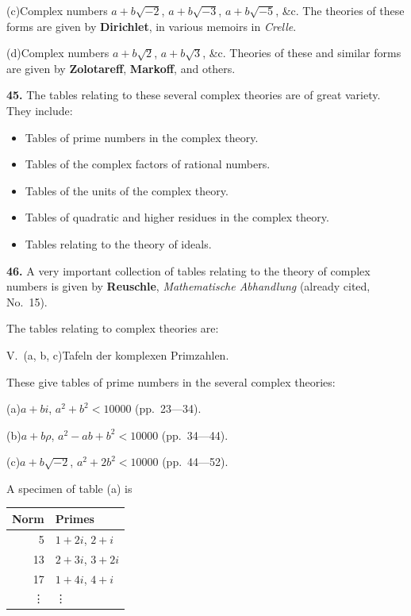 \documentclass[11pt,a4paper]{book}
\begin{document}
\quad(c)\quad Complex numbers $a + b\sqrt{-2}$, $a + b\sqrt{-3}$, $a + b\sqrt{-5}$, \&c.
The theories of these forms are given by
\quad\textbf{Dirichlet}, in various memoirs in \textit{Crelle}.

\quad(d)\quad Complex numbers $a + b\sqrt{2}$, $a + b\sqrt{3}$, \&c.
Theories of these and similar forms are given by
\quad\textbf{Zolotareff}, \textbf{Markoff}, and others.

\textbf{45.} The tables relating to these several complex theories are of great variety.
They include:
\begin{itemize}
\item Tables of prime numbers in the complex theory.
\item Tables of the complex factors of rational numbers.
\item Tables of the units of the complex theory.
\item Tables of quadratic and higher residues in the complex theory.
\item Tables relating to the theory of ideals.
\end{itemize}

\textbf{46.} A very important collection of tables relating to the theory of complex numbers
is given by
\quad\textbf{Reuschle}, \textit{Mathematische Abhandlung} (already cited, No.\ 15).

The tables relating to complex theories are:

\quad V.\ (a, b, c)\quad Tafeln der komplexen Primzahlen.

These give tables of prime numbers in the several complex theories:

\quad(a)\quad $a + bi$, $a^{2} + b^{2} < 10000$ (pp.\ 23---34).

\quad(b)\quad $a + b\rho$, $a^{2} - ab + b^{2} < 10000$ (pp.\ 34---44).

\quad(c)\quad $a + b\sqrt{-2}$, $a^{2} + 2b^{2} < 10000$ (pp.\ 44---52).

A specimen of table (a) is
\begin{center}\begin{tabular}{r|l}
Norm & Primes \\
\hline
5 & $1 + 2i$, $2 + i$ \\
13 & $2 + 3i$, $3 + 2i$ \\
17 & $1 + 4i$, $4 + i$ \\
\vdots & \vdots \\
\end{tabular}\end{center}
\end{document}
